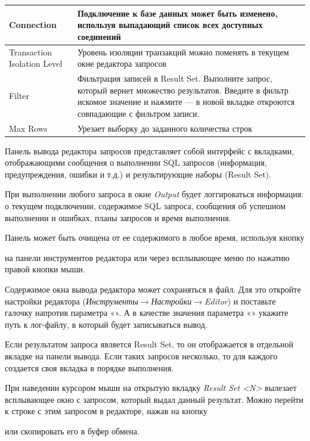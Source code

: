 \begin{longtable}[c]{|>{\ttfamily}m{2.8cm}|m{12.5cm}|}
	\hline
	Connection & Подключение к базе данных может быть изменено, используя выпадающий список всех доступных соединений \\\hline
	Transaction Isolation Level & Уровень изоляции транзакций можно поменять в текущем окне редактора запросов \\\hline
	Filter & Фильтрация записей в Result Set. Выполните запрос, который вернет множество результатов. Введите в фильтр искомое значение и нажмите \ttt{Enter} --- в новой вкладке откроются совпадающие с фильтром записи. \\\hline
	Max Rows & Урезает выборку до заданного количества строк \\\hline
\end{longtable}	


Панель вывода редактора запросов представляет собой интерфейс с вкладками, отображающими сообщения о выполнении SQL запросов (информация, предупреждения, ошибки и т.д.) и результирующие наборы (Result Set).

При выполнении любого запроса в окне \textit{Output} будет логгироваться информация: о текущем подключении, содержимое SQL запроса, сообщения об успешном выполнении и ошибках, планы запросов и время выполнения.

Панель может быть очищена от ее содержимого в любое время, используя кнопку  на панели инструментов редактора или через всплывающее меню по нажатию правой кнопки мыши.

Содержимое окна вывода редактора может сохраняться в файл. Для это откройте настройки редактора (\textit{Инструменты}$\rightarrow$\textit{Настройки}$\rightarrow$\textit{Editor}) и поставьте галочку напротив параметра «». А в качестве значения параметра  «» укажите путь к лог-файлу, в который будет записываться вывод.

\label{sec:resultset}

Если результатом запроса является Result Set, то он отображается в отдельной вкладке на панели вывода. Если таких запросов несколько, то для каждого создается своя вкладка в порядке выполнения.

При наведении курсором мыши на открытую вкладку \textit{Result Set <N>} вылезает всплывающее окно с запросом, который выдал данный результат. Можно перейти к строке с этим запросом в редакторе, нажав на кнопку 
 или скопировать его в буфер обмена. 

